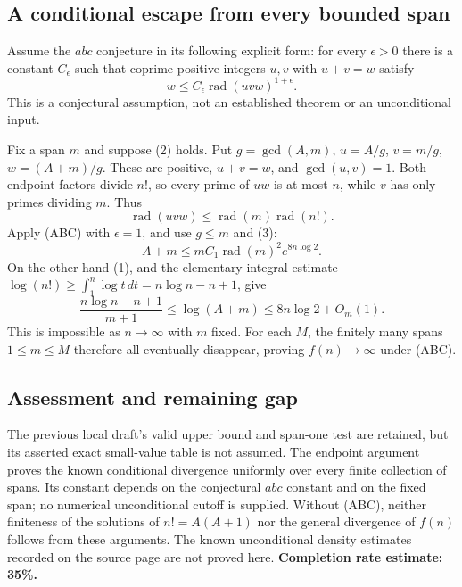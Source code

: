 \subsection*{A conditional escape from every bounded span}
Assume the $abc$ conjecture in its following explicit form: for every $\epsilon>0$ there is a constant $C_\epsilon$ such that coprime positive integers $u,v$ with $u+v=w$ satisfy
\[
 w\le C_\epsilon\operatorname{rad}(uvw)^{1+\epsilon}. \tag{ABC}
\]
This is a conjectural assumption, not an established theorem or an unconditional input.

Fix a span $m$ and suppose (2) holds. Put $g=\gcd(A,m)$, $u=A/g$, $v=m/g$, $w=(A+m)/g$. These are positive, $u+v=w$, and $\gcd(u,v)=1$. Both endpoint factors divide $n!$, so every prime of $uw$ is at most $n$, while $v$ has only primes dividing $m$. Thus
\[
 \operatorname{rad}(uvw)\le \operatorname{rad}(m)\operatorname{rad}(n!).
\]
Apply (ABC) with $\epsilon=1$, and use $g\le m$ and (3):
\[
 A+m\le m C_1\operatorname{rad}(m)^2 e^{8n\log2}.
\]
On the other hand (1), and the elementary integral estimate
$\log(n!)\ge\int_1^n\log t\,dt=n\log n-n+1$, give
\[
 \frac{n\log n-n+1}{m+1}\le \log(A+m)
 \le8n\log2+O_m(1).
\]
This is impossible as $n\to\infty$ with $m$ fixed. For each $M$, the finitely many spans $1\le m\le M$ therefore all eventually disappear, proving $f(n)\to\infty$ under (ABC).

\subsection*{Assessment and remaining gap}
The previous local draft's valid upper bound and span-one test are retained, but its asserted exact small-value table is not assumed. The endpoint argument proves the known conditional divergence uniformly over every finite collection of spans. Its constant depends on the conjectural $abc$ constant and on the fixed span; no numerical unconditional cutoff is supplied. Without (ABC), neither finiteness of the solutions of $n!=A(A+1)$ nor the general divergence of $f(n)$ follows from these arguments. The known unconditional density estimates recorded on the source page are not proved here.
\textbf{Completion rate estimate: 35\%.}
